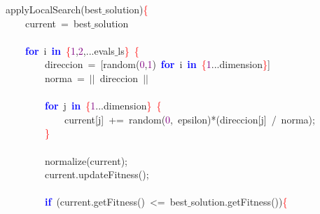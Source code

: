 \noindent
\mbox{}applyLocalSearch\textcolor{BrickRed}{(}best$\_$solution\textcolor{BrickRed}{)}\textcolor{Red}{\{} \\
\mbox{}\ \ \ \ current\ \textcolor{BrickRed}{=}\ best$\_$solution \\
\mbox{} \\
\mbox{}\ \ \ \ \textbf{\textcolor{Blue}{for}}\ i\ \textbf{\textcolor{Blue}{in}}\ \textcolor{Red}{\{}\textcolor{Purple}{1}\textcolor{BrickRed}{,}\textcolor{Purple}{2}\textcolor{BrickRed}{,...}evals$\_$ls\textcolor{Red}{\}}\ \textcolor{Red}{\{} \\
\mbox{}\ \ \ \ \ \ \ \ direccion\ \textcolor{BrickRed}{=}\ \textcolor{BrickRed}{[}random\textcolor{BrickRed}{(}\textcolor{Purple}{0}\textcolor{BrickRed}{,}\textcolor{Purple}{1}\textcolor{BrickRed}{)}\ \textbf{\textcolor{Blue}{for}}\ i\ \textbf{\textcolor{Blue}{in}}\ \textcolor{Red}{\{}\textcolor{Purple}{1}\textcolor{BrickRed}{...}dimension\textcolor{Red}{\}}\textcolor{BrickRed}{]} \\
\mbox{}\ \ \ \ \ \ \ \ norma\ \textcolor{BrickRed}{=}\ \textcolor{BrickRed}{$|$$|$}\ direccion\ \textcolor{BrickRed}{$|$$|$} \\
\mbox{} \\
\mbox{}\ \ \ \ \ \ \ \ \textbf{\textcolor{Blue}{for}}\ j\ \textbf{\textcolor{Blue}{in}}\ \textcolor{Red}{\{}\textcolor{Purple}{1}\textcolor{BrickRed}{...}dimension\textcolor{Red}{\}}\ \textcolor{Red}{\{} \\
\mbox{}\ \ \ \ \ \ \ \ \ \ \ \ current\textcolor{BrickRed}{[}j\textcolor{BrickRed}{]}\ \textcolor{BrickRed}{+=}\ random\textcolor{BrickRed}{(}\textcolor{Purple}{0}\textcolor{BrickRed}{,}\ epsilon\textcolor{BrickRed}{)*(}direccion\textcolor{BrickRed}{[}j\textcolor{BrickRed}{]}\ \textcolor{BrickRed}{/}\ norma\textcolor{BrickRed}{);} \\
\mbox{}\ \ \ \ \ \ \ \ \textcolor{Red}{\}} \\
\mbox{} \\
\mbox{}\ \ \ \ \ \ \ \ normalize\textcolor{BrickRed}{(}current\textcolor{BrickRed}{);} \\
\mbox{}\ \ \ \ \ \ \ \ current\textcolor{BrickRed}{.}updateFitness\textcolor{BrickRed}{();} \\
\mbox{} \\
\mbox{}\ \ \ \ \ \ \ \ \textbf{\textcolor{Blue}{if}}\ \textcolor{BrickRed}{(}current\textcolor{BrickRed}{.}getFitness\textcolor{BrickRed}{()}\ \textcolor{BrickRed}{\textless{}=}\ best$\_$solution\textcolor{BrickRed}{.}getFitness\textcolor{BrickRed}{())}\textcolor{Red}{\{} \\
